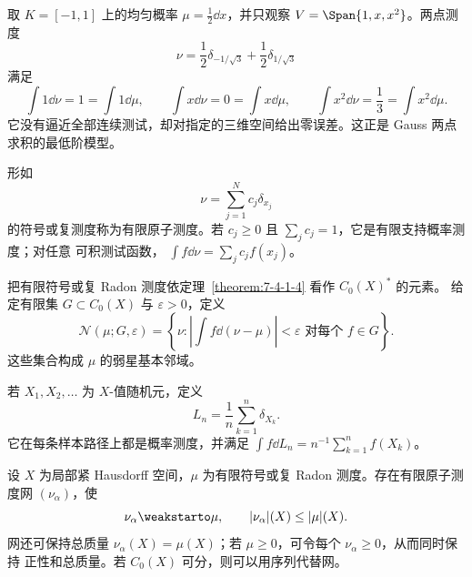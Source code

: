 \begin{example}[矩匹配求积]\label{ex:7-4-2-3}
取 $K=[-1,1]$ 上的均匀概率 $\mu=\frac12\dd x$，并只观察
$V=\Span\{1,x,x^2\}$。两点测度
\[
 \nu=\frac12\delta_{-1/\sqrt3}+\frac12\delta_{1/\sqrt3}
\]
满足
\[
 \int1\dd\nu=1=\int1\dd\mu,\qquad
 \int x\dd\nu=0=\int x\dd\mu,\qquad
 \int x^2\dd\nu=\frac13=\int x^2\dd\mu.
\]
它没有逼近全部连续测试，却对指定的三维空间给出零误差。这正是 Gauss 两点求积的最低阶模型。
\end{example}

\begin{definition}[原子测度]\label{def:7-4-2-1}
形如
\[
 \nu=\sum_{j=1}^Nc_j\delta_{x_j}
\]
的符号或复测度称为有限原子测度。若 $c_j\ge0$ 且 $\sum_jc_j=1$，它是有限支持概率测度；对任意
可积测试函数，
$\int f\dd\nu=\sum_jc_jf(x_j)$。
\end{definition}

\begin{definition}[弱星测试邻域]\label{def:7-4-2-2}
把有限符号或复 Radon 测度依定理~\ref{theorem:7-4-1-4} 看作 $C_0(X)^*$ 的元素。
给定有限集 $G\subset C_0(X)$ 与 $\varepsilon>0$，定义
\[
 \mathcal N(\mu;G,\varepsilon)
 =\left\{\nu:
   \left|\int f\dd(\nu-\mu)\right|<\varepsilon
   \text{ 对每个 }f\in G
 \right\}.
\]
这些集合构成 $\mu$ 的弱星基本邻域。
\end{definition}

\begin{definition}[经验测度]\label{def:7-4-2-3}
若 $X_1,X_2,\ldots$ 为 $X$-值随机元，定义
\[
 L_n=\frac1n\sum_{k=1}^n\delta_{X_k}.
\]
它在每条样本路径上都是概率测度，并满足
$\int f\dd L_n=n^{-1}\sum_{k=1}^nf(X_k)$。
\end{definition}

\begin{theorem}\label{theorem:7-4-2-1}
设 $X$ 为局部紧 Hausdorff 空间，$\mu$ 为有限符号或复 Radon 测度。存在有限原子测度网
$(\nu_\alpha)$，使
\[
 \nu_\alpha\weakstarto\mu,
 \qquad |\nu_\alpha|(X)\le|\mu|(X).
\]
网还可保持总质量 $\nu_\alpha(X)=\mu(X)$；若 $\mu\ge0$，可令每个 $\nu_\alpha\ge0$，从而同时保持
正性和总质量。若 $C_0(X)$ 可分，则可以用序列代替网。
\end{theorem}

